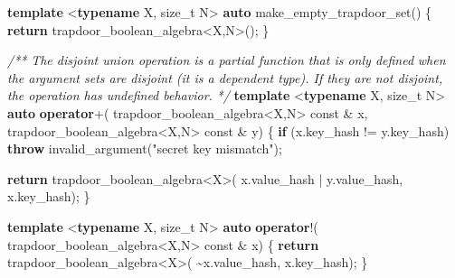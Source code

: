 \documentclass[
]{article}
\newenvironment{Shaded}{\begin{snugshade}}{\end{snugshade}}
\newcommand{\AttributeTok}[1]{\textcolor[rgb]{0.77,0.63,0.00}{#1}}
\newcommand{\CommentTok}[1]{\textcolor[rgb]{0.56,0.35,0.01}{\textit{#1}}}
\newcommand{\ControlFlowTok}[1]{\textcolor[rgb]{0.13,0.29,0.53}{\textbf{#1}}}
\newcommand{\DataTypeTok}[1]{\textcolor[rgb]{0.13,0.29,0.53}{#1}}
\newcommand{\KeywordTok}[1]{\textcolor[rgb]{0.13,0.29,0.53}{\textbf{#1}}}
\newcommand{\NormalTok}[1]{#1}
\newcommand{\StringTok}[1]{\textcolor[rgb]{0.31,0.60,0.02}{#1}}
\begin{document}
\begin{Shaded}
\begin{Highlighting}[]
\KeywordTok{template}\NormalTok{ \textless{}}\KeywordTok{typename}\NormalTok{ X, }\DataTypeTok{size\_t}\NormalTok{ N\textgreater{}}
\KeywordTok{auto}\NormalTok{ make\_empty\_trapdoor\_set()}
\NormalTok{\{}
    \ControlFlowTok{return}\NormalTok{ trapdoor\_boolean\_algebra\textless{}X,N\textgreater{}();}
\NormalTok{\}}
\end{Highlighting}
\end{Shaded}

\begin{Shaded}
\begin{Highlighting}[]
\CommentTok{/**}
\CommentTok{The disjoint union operation is a partial function that is only defined}
\CommentTok{when the argument sets are disjoint (it is a dependent type). If they are}
\CommentTok{not disjoint, the operation has undefined behavior.}
\CommentTok{ */}
\KeywordTok{template}\NormalTok{ \textless{}}\KeywordTok{typename}\NormalTok{ X, }\DataTypeTok{size\_t}\NormalTok{ N\textgreater{}}
\KeywordTok{auto} \KeywordTok{operator}\NormalTok{+(}
\NormalTok{    trapdoor\_boolean\_algebra\textless{}X,N\textgreater{} }\AttributeTok{const}\NormalTok{ \& x,}
\NormalTok{    trapdoor\_boolean\_algebra\textless{}X,N\textgreater{} }\AttributeTok{const}\NormalTok{ \& y)}
\NormalTok{\{}
    \ControlFlowTok{if}\NormalTok{ (x.key\_hash != y.key\_hash)}
        \ControlFlowTok{throw}\NormalTok{ invalid\_argument(}\StringTok{"secret key mismatch"}\NormalTok{);}

    \ControlFlowTok{return}\NormalTok{ trapdoor\_boolean\_algebra\textless{}X\textgreater{}(}
\NormalTok{        x.value\_hash | y.value\_hash,}
\NormalTok{        x.key\_hash);}
\NormalTok{\}}
\end{Highlighting}
\end{Shaded}

\begin{Shaded}
\begin{Highlighting}[]
\KeywordTok{template}\NormalTok{ \textless{}}\KeywordTok{typename}\NormalTok{ X, }\DataTypeTok{size\_t}\NormalTok{ N\textgreater{}}
\KeywordTok{auto} \KeywordTok{operator}\NormalTok{!(}
\NormalTok{    trapdoor\_boolean\_algebra\textless{}X,N\textgreater{} }\AttributeTok{const}\NormalTok{ \& x)}
\NormalTok{\{}
    \ControlFlowTok{return}\NormalTok{ trapdoor\_boolean\_algebra\textless{}X\textgreater{}(}
\NormalTok{        \textasciitilde{}x.value\_hash,}
\NormalTok{        x.key\_hash);}
\NormalTok{\}}
\end{Highlighting}
\end{Shaded}
\end{document}
